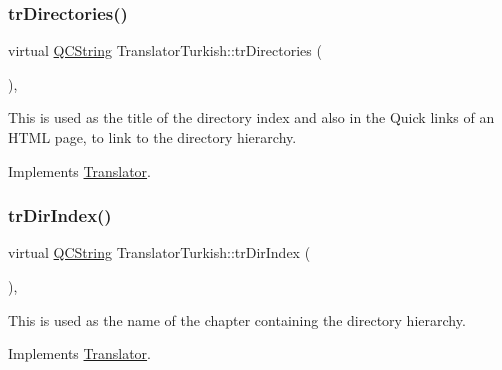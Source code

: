 \mbox{\label{class_translator_turkish_a50e7b9bfaab305a9d5d7769949fc11a3}} 
\subsubsection{\texorpdfstring{trDirectories()}{trDirectories()}}
{\footnotesize\ttfamily virtual \mbox{\hyperlink{class_q_c_string}{Q\+C\+String}} Translator\+Turkish\+::tr\+Directories (\begin{DoxyParamCaption}{ }\end{DoxyParamCaption})\hspace{0.3cm}{\ttfamily [inline]}, {\ttfamily [virtual]}}

This is used as the title of the directory index and also in the Quick links of an H\+T\+ML page, to link to the directory hierarchy. 

Implements \mbox{\hyperlink{class_translator}{Translator}}.

\mbox{\label{class_translator_turkish_aae108d7eb2daff0fabaaeb88560b54e5}} 
\subsubsection{\texorpdfstring{trDirIndex()}{trDirIndex()}}
{\footnotesize\ttfamily virtual \mbox{\hyperlink{class_q_c_string}{Q\+C\+String}} Translator\+Turkish\+::tr\+Dir\+Index (\begin{DoxyParamCaption}{ }\end{DoxyParamCaption})\hspace{0.3cm}{\ttfamily [inline]}, {\ttfamily [virtual]}}

This is used as the name of the chapter containing the directory hierarchy. 

Implements \mbox{\hyperlink{class_translator}{Translator}}.

\mbox{\label{class_translator_turkish_ac5cd20d1aebc16d09600b22d7644a29a}} 
